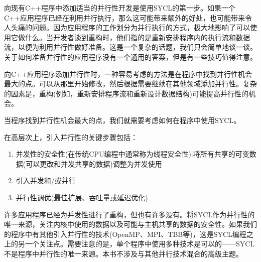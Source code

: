 向现有C++程序中添加适当的并行性开发是使用SYCL的第一步。如果一个C++应用程序已经在利用并行执行，那么这可能带来额外的好处，也可能带来令人头痛的问题。因为应用程序的工作划分为并行执行的方式，极大地影响了可以使用它做什么。当开发者谈到重构时，他们指的是重新安排程序内的执行流和数据流，以便为利用并行性做好准备。这是一个复杂的话题，我们只会简单地谈一谈。关于如何准备并行性的应用程序没有一个通用的答案，但是有一些技巧值得注意。\par

向C++应用程序添加并行性时，一种容易考虑的方法是在程序中找到并行性机会最大的点。可以从那里开始修改，然后根据需要继续在其他领域添加并行性。复杂的因素是，重构(例如，重新安排程序流和重新设计数据结构)可能提高并行性的机会。\par

当程序找到并行性机会最大的点，我们就需要考虑如何在程序中使用SYCL。\par

在高层次上，引入并行性的关键步骤包括：\par

\begin{enumerate}
	\item 并发性的安全性(在传统CPU编程中通常称为线程安全性):将所有共享的可变数据(可以更改和并发共享的数据)调整为并发使用
	\item 引入并发和/或并行
	\item 并行性调优(最佳扩展、吞吐量或延迟优化)
\end{enumerate}

许多应用程序已经为并发性进行了重构，但也有许多没有。将SYCL作为并行性的唯一来源，关注内核中使用的数据以及可能与主机共享的数据的安全性。如果我们的程序中有其他引入并行性的技术(OpenMP、MPI、TBB等)，这是SYCL编程之上的另一个关注点。需要注意的是，单个程序中使用多种技术是可以的——SYCL不是程序中并行性的唯一来源。本书不涉及与其他并行技术混合的高级主题。\par




















































